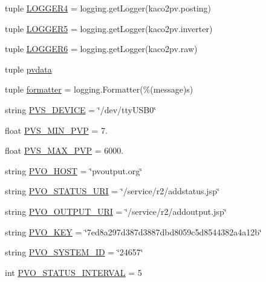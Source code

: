\begin{DoxyCompactItemize}
\item 
tuple \hyperlink{namespacekaco2pvo_a4fa57148f3e1066de4c3ed0a7d5e9c23}{L\+O\+G\+G\+E\+R4} = logging.\+get\+Logger(\textquotesingle{}kaco2pv.\+posting\textquotesingle{})
\item 
tuple \hyperlink{namespacekaco2pvo_aa8eefb9bf8bad3161b1b878bd55236c5}{L\+O\+G\+G\+E\+R5} = logging.\+get\+Logger(\textquotesingle{}kaco2pv.\+inverter\textquotesingle{})
\item 
tuple \hyperlink{namespacekaco2pvo_ab56cb6cd6e8dc59acbbf03cb09c7a522}{L\+O\+G\+G\+E\+R6} = logging.\+get\+Logger(\textquotesingle{}kaco2pv.\+raw\textquotesingle{})
\item 
tuple \hyperlink{namespacekaco2pvo_ae4ae0e0b0d3db2f9db79cda692b34f21}{pvdata}
\item 
tuple \hyperlink{namespacekaco2pvo_acc7f29a549e72ad45ff6e4e2d1410219}{formatter} = logging.\+Formatter(\textquotesingle{}\%(message)s\textquotesingle{})
\item 
string \hyperlink{namespacekaco2pvo_ac673eb9e5b727f759eeea8edb990c81c}{P\+V\+S\+\_\+\+D\+E\+V\+I\+C\+E} = \char`\"{}/dev/tty\+U\+S\+B0\char`\"{}
\item 
float \hyperlink{namespacekaco2pvo_a254420e2cbb7034d7e494c8176a724ad}{P\+V\+S\+\_\+\+M\+I\+N\+\_\+\+P\+V\+P} = 7.
\item 
float \hyperlink{namespacekaco2pvo_aecad1a1f015e701294ae4e083bfade40}{P\+V\+S\+\_\+\+M\+A\+X\+\_\+\+P\+V\+P} = 6000.
\item 
string \hyperlink{namespacekaco2pvo_a9e9b5ee47557bde93b45c986ada366c4}{P\+V\+O\+\_\+\+H\+O\+S\+T} = \char`\"{}pvoutput.\+org\char`\"{}
\item 
string \hyperlink{namespacekaco2pvo_a1c058de251e3097097b3ca46627e9572}{P\+V\+O\+\_\+\+S\+T\+A\+T\+U\+S\+\_\+\+U\+R\+I} = \char`\"{}/service/r2/addstatus.\+jsp\char`\"{}
\item 
string \hyperlink{namespacekaco2pvo_aa9eb4b879b1b7bc4d18c426a30003d8a}{P\+V\+O\+\_\+\+O\+U\+T\+P\+U\+T\+\_\+\+U\+R\+I} = \char`\"{}/service/r2/addoutput.\+jsp\char`\"{}
\item 
string \hyperlink{namespacekaco2pvo_ad88154b2fb00beb1cfbfae5585af5ac9}{P\+V\+O\+\_\+\+K\+E\+Y} = \char`\"{}7ed8a297d387d3887dbd8059c5d8544382a4a12b\char`\"{}
\item 
string \hyperlink{namespacekaco2pvo_aa43938367200428da66c8ef5a5997de1}{P\+V\+O\+\_\+\+S\+Y\+S\+T\+E\+M\+\_\+\+I\+D} = \char`\"{}24657\char`\"{}
\item 
int \hyperlink{namespacekaco2pvo_af394104e75126491b592392ef4a496c3}{P\+V\+O\+\_\+\+S\+T\+A\+T\+U\+S\+\_\+\+I\+N\+T\+E\+R\+V\+A\+L} = 5

\end{DoxyCompactItemize}
